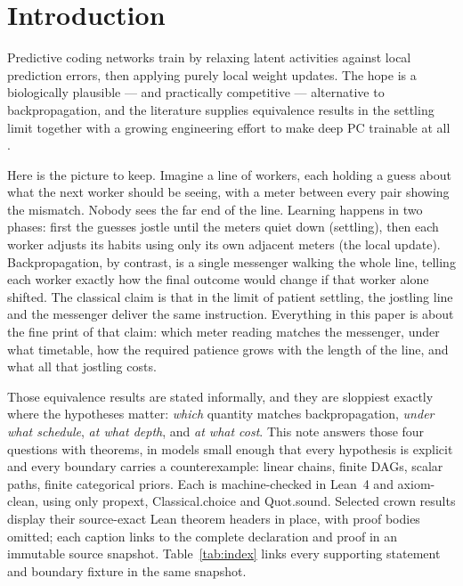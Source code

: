 \documentclass[11pt]{article}
\newcommand{\leanname}[1]{{\scriptsize\ttfamily
  \def\_{\textunderscore\allowbreak}#1}}
\begin{document}
\section{Introduction}

Predictive coding networks train by relaxing latent activities against local prediction
errors, then applying purely local weight updates. The hope is a biologically plausible
--- and practically competitive --- alternative to backpropagation, and the literature
supplies equivalence results in the settling limit together with a growing engineering
effort to make deep PC trainable at all
\cite{whittington2017,song2020,millidge2020,salvatori2022,goemaere2025}.

Here is the picture to keep. Imagine a line of workers, each holding a guess about what
the next worker should be seeing, with a meter between every pair showing the mismatch.
Nobody sees the far end of the line. Learning happens in two phases: first the guesses
jostle until the meters quiet down (settling), then each worker adjusts its habits using
only its own adjacent meters (the local update). Backpropagation, by contrast, is a
single messenger walking the whole line, telling each worker exactly how the final
outcome would change if that worker alone shifted. The classical claim is that in the
limit of patient settling, the jostling line and the messenger deliver the same
instruction. Everything in this paper is about the fine print of that claim: which meter
reading matches the messenger, under what timetable, how the required patience grows
with the length of the line, and what all that jostling costs.

Those equivalence results are stated informally, and they are sloppiest exactly where
the hypotheses matter: \emph{which} quantity matches backpropagation, \emph{under what
schedule}, \emph{at what depth}, and \emph{at what cost}. This note answers those four
questions with theorems, in models small enough that every hypothesis is explicit and
every boundary carries a counterexample: linear chains, finite DAGs, scalar paths,
finite categorical priors. Each is machine-checked in Lean~4 and axiom-clean, using only
\leanname{propext}, \leanname{Classical.choice} and \leanname{Quot.sound}. Selected
crown results display their source-exact Lean theorem headers in place, with proof
bodies omitted; each caption links to the complete declaration and proof in an
immutable source snapshot. Table~\ref{tab:index} links every supporting statement and
boundary fixture in the same snapshot.
\end{document}
